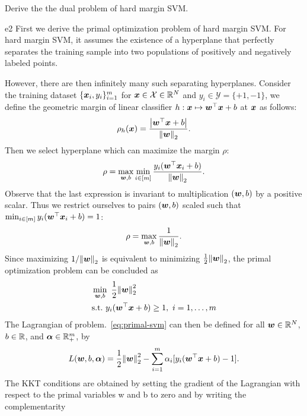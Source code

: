\begin{excercise}\label{e2}
    Derive the the dual problem of hard margin SVM.
\end{excercise}

\begin{SOLUTION}{e2}
    First we derive the primal optimization problem of hard margin SVM. For hard margin SVM, it assumes the existence of a hyperplane that perfectly separates the training
    sample into two populations of positively and negatively labeled points. 
    
    However, there are then infinitely many such separating hyperplanes. Consider the training dataset \(\{\bm{x}_i, y_i\}_{i=1}^m\) for \(\bm{x} \in \mathcal{X} \in \mathbb{R}^N\) and 
    \(y_i \in \mathcal{Y} = \{+1, -1\}\), we define the geometric margin of linear classifier \(h: \bm{x} \mapsto \bm{w}^\top \bm{x} + b\) at \(\bm{x}\) as follows:
    \[
        \rho_h(\bm{x}) = \frac{\abs{\bm{w}^\top \bm{x} + b}}{\norm{\bm{w}}_2}.  
    \]
    Then we select hyperplane which can maximize the margin \(\rho\):
    \[
        \rho = \max_{\bm{w}, b} \min_{i \in [m]} \frac{y_i (\bm{w}^\top \bm{x}_i + b)}{ \norm{\bm{w}}_2}.  
    \]
    Observe that the last expression is invariant to multiplication \((\bm{w}, b)\) by a positive scalar.
    Thus we restrict ourselves to pairs \((\bm{w}, b)\) scaled such that \(\min_{i \in [m]} y_i(\bm{w}^\top \bm{x}_i + b)= 1\):
    \[
        \rho = \max_{\bm{w}, b} \frac{1}{\norm{\bm{w}}_2}.  
    \]
    Since maximizing \(1/\norm{\bm{w}}_2\) is equivalent to minimizing \(\frac{1}{2}\norm{\bm{w}}_2\), the primal optimization problem can be concluded as
    \begin{equation}\label{eq:primal-svm}
        \begin{aligned}
            &\min_{\bm{w}, b} ~ \frac{1}{2} \norm{\bm{w}}^2_2 \\
            &\text{s.t.} ~ y_i (\bm{w}^\top \bm{x} + b) \ge 1, ~i = 1, \dots, m
        \end{aligned}
    \end{equation}
    The Lagrangian of problem.~\ref*{eq:primal-svm} can then be defined for all \(\bm{w} \in \mathbb{R}^N\),
    \(b \in \mathbb{R}\), and \(\bm{\alpha} \in \mathbb{R}_+^m\), by
    \begin{equation}
        L(\bm{w}, b, \bm{\alpha}) = \frac{1}{2} \norm{\bm{w}}_2^2 - \sum_{i=1}^m \alpha_i [y_i (\bm{w}^\top \bm{x} + b) - 1].
    \end{equation}
    The KKT conditions are obtained by setting the gradient of the Lagrangian with
    respect to the primal variables w and b to zero and by writing the complementarity

\end{SOLUTION}
